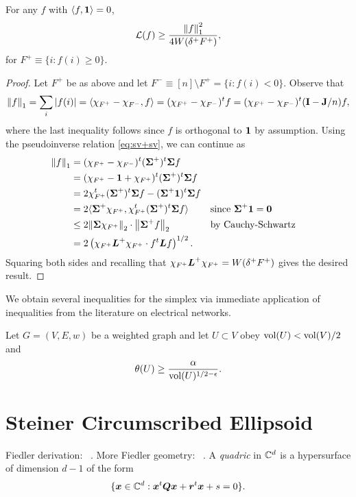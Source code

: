 \begin{lemma}
For any $f$ with $\langle f,\vb{1}\rangle=0$, \begin{equation*}
    \mathcal{L}(f) \geq \frac{\norm{f}_1^2}{4W(\delta^+F^+)},
\end{equation*}
for $F^+\equiv \{i:f(i)\geq 0\}$. 
\end{lemma}
\begin{proof}
Let $F^+$ be as above and let $F^-\equiv [n]\setminus F^+=\{i:f(i)<0\}$. Observe that 
\begin{equation*}
    \norm{f}_1=\sum_i |f(i)| = \langle \chi_{F^+}-\chi_{F^-},f\rangle = (\chi_{F^+}-\chi_{F^-})^t f = (\chi_{F^+}-\chi_{F^-})^t(\vb{I}-\vb{J}/n) f,
\end{equation*}
where the last inequality follows since $f$ is orthogonal to $\vb{1}$ by assumption. Using the pseudoinverse relation \eqref{eq:sv+sv}, we can continue as 
\begin{align*}
    \norm{f}_1 &= (\chi_{F^+}-\chi_{F^-})^t(\boldsymbol{\Sigma}^+)^t \boldsymbol{\Sigma} f \\
    &= (\chi_{F^+}-\vb{1} + \chi_{F^+})^t(\boldsymbol{\Sigma}^+)^t \boldsymbol{\Sigma} f \\
    &=2\chi_{F^+}^t (\boldsymbol{\Sigma}^+)^t \boldsymbol{\Sigma} f - (\boldsymbol{\Sigma}^+\vb{1})^t \boldsymbol{\Sigma} f \\
    &= 2\langle \boldsymbol{\Sigma}^+\chi_{F^+}, \chi_{F^+}^t (\boldsymbol{\Sigma}^+)^t \boldsymbol{\Sigma} f \rangle &&\text{since }\boldsymbol{\Sigma}^+\vb{1} =\vb{0}\\
    &\leq 2\norm{\boldsymbol{\Sigma}\chi_{F^+}}_2 \cdot \norm{\boldsymbol{\Sigma}^+ f}_2 &&\text{by Cauchy-Schwartz}\\
    &= 2\left(\chi_{F^+}\vb*{L}^+\chi_{F^+}\cdot f^t \vb*{L} f\right)^{1/2}.
\end{align*}
Squaring both sides and recalling that $\chi_{F^+}\vb*{L}^+\chi_{F^+} = W(\delta^+F^+)$ gives the desired result. 
\end{proof}

We obtain several inequalities for the simplex via immediate application of inequalities from the literature on electrical networks. 


\begin{lemma}
Let $G=(V,E,w)$ be a weighted graph and let $U\subset V$ obey $\textnormal{vol}(U)<\textnormal{vol}(V)/2$ and \[\theta(U) \geq \frac{\alpha}{\textnormal{vol}(U)^{1/2-\epsilon}}.\]
\end{lemma}
\todo {}

\section{Steiner Circumscribed Ellipsoid}
\todo  {}
Fiedler derivation: ~\cite{fiedler2005geometry}. More Fiedler geometry: ~\cite{fiedler1993geometric}. 
A \emph{quadric} in $\mathbb{C}^d$ is a hypersurface of dimension $d-1$ of the form 
\begin{equation*}
\{\vb*{x}\in\mathbb{C}^d: \vb*{x}^t \vb*{Q}\vb*{x} + \vb*{r}^t \vb*{x} + s=0\}.
\end{equation*}


